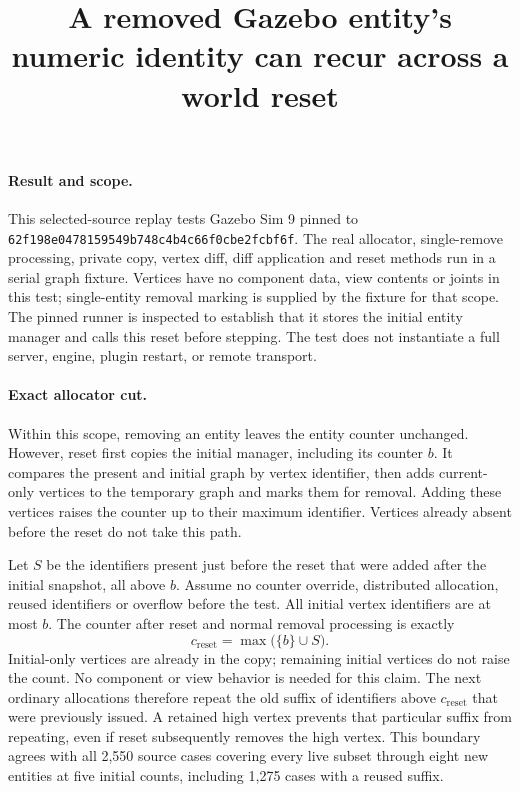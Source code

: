 \documentclass{article}
\begin{document}
\title{A removed Gazebo entity's numeric identity can recur across a world reset}
\maketitle

\paragraph{Result and scope.}
This selected-source replay tests Gazebo Sim 9 pinned to
\texttt{62f198e0478159549b748c4b4c66f0cbe2fcbf6f}. The real allocator,
single-remove processing, private copy, vertex diff, diff application
and reset methods run in a serial graph fixture. Vertices have no
component data, view contents or joints in this test; single-entity
removal marking is supplied by the fixture for that scope. The pinned
runner is inspected to establish that it stores the initial entity
manager and calls this reset before stepping. The test does not
instantiate a full server, engine, plugin restart, or remote transport.

\paragraph{Exact allocator cut.}
Within this scope, removing an entity leaves the entity counter unchanged.
However, reset first copies the initial manager, including its counter
$b$. It compares the present and initial graph by vertex identifier, then
adds current-only vertices to the temporary graph and marks them for
removal. Adding these vertices raises the counter up to their maximum
identifier. Vertices already absent before the reset do not take this path.

Let $S$ be the identifiers present just before the reset that were added
after the initial snapshot, all above $b$. Assume no counter override,
distributed allocation, reused identifiers or overflow before the test.
All initial vertex identifiers are at most $b$. The counter after reset
and normal removal processing is exactly
\[
c_{\mathrm{reset}}=\max\bigl(\{b\}\cup S\bigr).
\]
Initial-only vertices are already in the copy; remaining initial vertices
do not raise the count. No component or view behavior is needed for this
claim. The next ordinary allocations therefore repeat the old suffix
of identifiers above $c_{\mathrm{reset}}$ that were previously issued.
A retained high vertex prevents that particular suffix from repeating,
even if reset subsequently removes the high vertex. This boundary agrees
with all 2,550 source cases covering every live subset through eight
new entities at five initial counts, including 1,275 cases with a
reused suffix.
\end{document}
